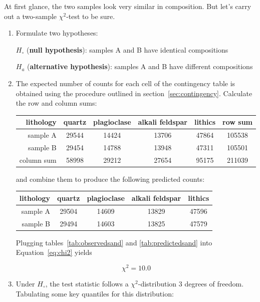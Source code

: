 At first glance, the two samples look very similar in composition. But
let's carry out a two-sample $\chi^2$-test to be sure.

\begin{enumerate}
\item  Formulate two hypotheses:

  $H_\circ$ (\textbf{null hypothesis}):
  samples A and B have identical compositions

  $H_a$ (\textbf{alternative hypothesis}):
  samples A and B have different compositions
  
\item The expected number of counts for each cell of the contingency
  table is obtained using the procedure outlined in
  section~\ref{sec:contingency}. Calculate the row and column sums:

  \begin{center}
    \begin{tabular}{r|cccc|c}
      lithology & quartz & plagioclase & alkali feldspar &
      lithics & row sum \\ \hline
      sample A & 29544 & 14424 & 13706 & 47864 & 105538 \\
      sample B & 29454 & 14788 & 13948 & 47311 & 105501 \\ \hline
      column sum & 58998 & 29212 & 27654 & 95175 & 211039
    \end{tabular}
  \end{center}

  \noindent and combine them to produce the following predicted
  counts:

  \begin{center}
    \begin{tabular}{r|cccc}
      lithology & quartz & plagioclase & alkali feldspar & lithics  \\ \hline
      sample A & 29504 & 14609 & 13829 & 47596 \\
      sample B & 29494 & 14603 & 13825 & 47579 \\
    \end{tabular}
    \label{tab:predictedsand}
  \end{center}

  Plugging tables~\ref{tab:observedsand} and \ref{tab:predictedsand}
  into Equation~\ref{eq:chi2} yields

  \[
  \chi^2 = 10.0
  \]

\item Under $H_\circ$, the test statistic follows a
  $\chi^2$-distribution 3 degrees of freedom. Tabulating some key
  quantiles for this distribution:


\end{enumerate}
